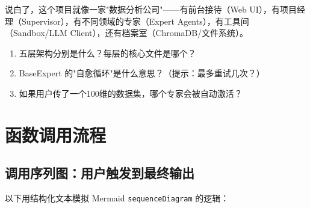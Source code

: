 \documentclass[11pt,a4paper]{ctexbook}
\begin{document}
\begin{plainbox}
    说白了，这个项目就像一家"数据分析公司"——有前台接待（Web UI），有项目经理（Supervisor），有不同领域的专家（Expert Agents），有工具间（Sandbox/LLM Client），还有档案室（ChromaDB/文件系统）。
\end{plainbox}

\begin{reviewbox}
    \begin{enumerate}
        \item 五层架构分别是什么？每层的核心文件是哪个？
        \item BaseExpert 的"自愈循环"是什么意思？（提示：最多重试几次？）
        \item 如果用户传了一个100维的数据集，哪个专家会被自动激活？
    \end{enumerate}
\end{reviewbox}

\chapter{函数调用流程}

\section{调用序列图：用户触发到最终输出}

以下用结构化文本模拟 Mermaid \texttt{sequenceDiagram} 的逻辑：
\end{document}
